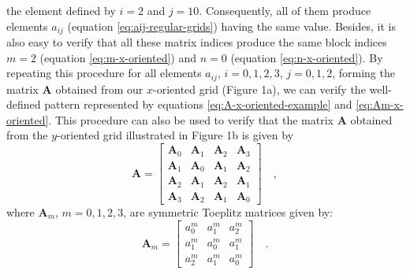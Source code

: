 \documentclass[manuscript,revised]{geophysics}
\begin{document}
the element defined by $i = 2$ and $j = 10$. Consequently, all of them produce
elements $a_{ij}$ (equation \ref{eq:aij-regular-grids}) having the same value.
Besides, it is also easy to verify that all these matrix indices produce the same block
indices $m = 2$ (equation \ref{eq:m-x-oriented}) and $n = 0$ (equation \ref{eq:n-x-oriented}).
By repeating this procedure for all elements $a_{ij}$, $i = 0, 1, 2, 3$, $j = 0, 1, 2$, 
forming the matrix $\mathbf{A}$ obtained from our $x$-oriented grid (Figure 1a),
we can verify the well-defined pattern represented by equations 
\ref{eq:A-x-oriented-example} and \ref{eq:Am-x-oriented}.
This procedure can also be used to verify that the matrix $\mathbf{A}$ obtained
from the $y$-oriented grid illustrated in Figure 1b is given by
\begin{equation}
\mathbf{A} = \begin{bmatrix}
\mathbf{A}_{0} & \mathbf{A}_{1} & \mathbf{A}_{2} & \mathbf{A}_{3} \\
\mathbf{A}_{1} & \mathbf{A}_{0} & \mathbf{A}_{1} & \mathbf{A}_{2} \\
\mathbf{A}_{2} & \mathbf{A}_{1} & \mathbf{A}_{2} & \mathbf{A}_{1} \\
\mathbf{A}_{3} & \mathbf{A}_{2} & \mathbf{A}_{1} & \mathbf{A}_{0}
\end{bmatrix} \quad ,
\label{eq:A-y-oriented-example}
\end{equation}
where $\mathbf{A}_{m}$, $m = 0, 1, 2, 3$, are symmetric Toeplitz matrices given by:
\begin{equation}
\mathbf{A}_{m} = \begin{bmatrix}
a^{m}_{0} & a^{m}_{1} & a^{m}_{2} \\
a^{m}_{1} & a^{m}_{0} & a^{m}_{1} \\
a^{m}_{2} & a^{m}_{1} & a^{m}_{0}
\end{bmatrix} \quad .
\label{eq:Am-y-oriented}
\end{equation}
\end{document}
